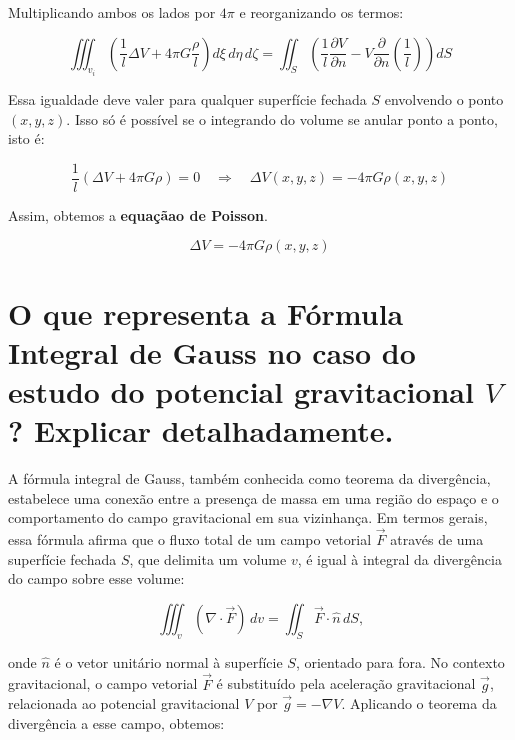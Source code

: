 \noindent
Multiplicando ambos os lados por $4\pi$ e reorganizando os termos:

\begin{equation}
\iiint_{v_i} \left( \frac{1}{l} \Delta V + 4\pi G \frac{\rho}{l} \right) d\xi \, d\eta \, d\zeta = \iint_S \left( \frac{1}{l} \frac{\partial V}{\partial n} - V \frac{\partial}{\partial n} \left( \frac{1}{l} \right) \right) dS
\end{equation}

\noindent
Essa igualdade deve valer para qualquer superfície fechada $S$ envolvendo o ponto $(x, y, z)$. Isso só é possível se o integrando do volume se anular ponto a ponto, isto é:

\begin{equation}
\frac{1}{l} \left( \Delta V + 4\pi G \rho \right) = 0 \quad \Rightarrow \quad \boxed{\Delta V(x, y, z) = -4\pi G \rho(x, y, z)}
\end{equation}

\noindent
Assim, obtemos a \textbf{equaçãao de Poisson}.

\[
\boxed{\Delta V = -4\pi G \rho(x, y, z)}
\]


\section{O que representa a Fórmula Integral de Gauss no caso do estudo do potencial gravitacional $V$? Explicar detalhadamente.}


A fórmula integral de Gauss, também conhecida como teorema da divergência, estabelece uma conexão entre a presença de massa em uma região do espaço e o comportamento do campo gravitacional em sua vizinhança. Em termos gerais, essa fórmula afirma que o fluxo total de um campo vetorial \( \vec{F} \) através de uma superfície fechada \( S \), que delimita um volume \( v \), é igual à integral da divergência do campo sobre esse volume:

\[
\iiint_v (\nabla \cdot \vec{F}) \, dv = \iint_S \vec{F} \cdot \hat{n} \, dS \text{,}
\]

\noindent
onde \( \hat{n} \) é o vetor unitário normal à superfície \( S \), orientado para fora. No contexto gravitacional, o campo vetorial \( \vec{F} \) é substituído pela aceleração gravitacional \( \vec{g} \), relacionada ao potencial gravitacional \( V \) por \( \vec{g} = -\nabla V \). Aplicando o teorema da divergência a esse campo, obtemos:

